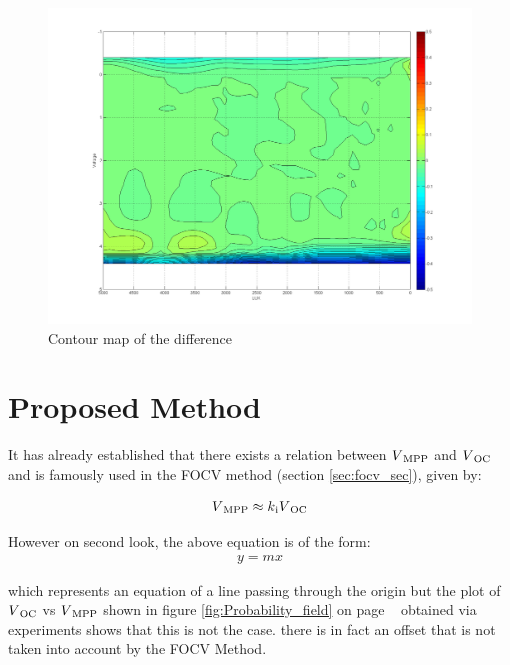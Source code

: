 \begin{figure}[H]
  \begin{center}
	  \includegraphics[width=\textwidth]{images/Contour_map}
	  \caption{Contour map of the difference}
	  \label{fig:Contour_map}
  \end{center}
\end{figure}

\section{Proposed Method } \label{sec:proposed_algo_sec}

It has already established that there exists a relation between $V\textsubscript{MPP}$ and $V\textsubscript{OC}$ and is famously used in the \ac{FOCV} method (section \ref{sec:focv_sec}), given by:

  \begin{equation}
   \begin{aligned}
	  V\textsubscript{MPP}\approx k\textsubscript{i}V\textsubscript{OC}
	  \label{eq:equ_fracoc_proposed}
  \end{aligned}
  \end{equation}  
  
However on second look, the above equation is of the form:
  \begin{equation}
     \begin{aligned}
  	 y = mx
  	  \label{eq:equ_line}
    \end{aligned}
    \end{equation}  
    
which represents an equation of a line passing through the origin but the plot of $V\textsubscript{OC}$ vs $V\textsubscript{MPP}$ shown in figure \ref{fig:Probability_field} on page ~\pageref{fig:Probability_field} obtained via experiments shows that this is not the case. there is in fact an offset that is not taken into account by the \ac{FOCV} Method.\\

